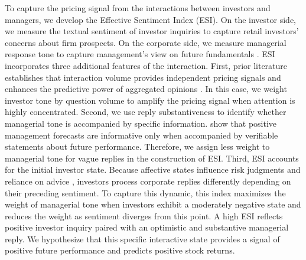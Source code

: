 \documentclass[12pt]{article}
\begin{document}
To capture the pricing signal from the interactions between investors and managers, we develop the Effective Sentiment Index (ESI). On the investor side, we measure the textual sentiment of investor inquiries to capture retail investors' concerns about firm prospects. On the corporate side, we measure managerial response tone to capture management's view on future fundamentals \citep{jiang2019,li2010}. ESI incorporates three additional features of the interaction. First, prior literature establishes that interaction volume provides independent pricing signals and enhances the predictive power of aggregated opinions \citep{chen2014,cookson2024}. In this case, we weight investor tone by question volume to amplify the pricing signal when attention is highly concentrated. Second, we use reply substantiveness to identify whether managerial tone is accompanied by specific information. \citet{hutton2003} show that positive management forecasts are informative only when accompanied by verifiable statements about future performance. Therefore, we assign less weight to managerial tone for vague replies in the construction of ESI. Third, ESI accounts for the initial investor state. Because affective states influence risk judgments and reliance on advice \citep{gino2012,loewenstein2001risk}, investors process corporate replies differently depending on their preceding sentiment. To capture this dynamic, this index maximizes the weight of managerial tone when investors exhibit a moderately negative state and reduces the weight as sentiment diverges from this point. A high ESI reflects positive investor inquiry paired with an optimistic and substantive managerial reply. We hypothesize that this specific interactive state provides a signal of positive future performance and predicts positive stock returns.
\end{document}
